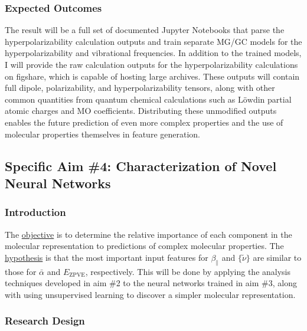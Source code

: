 \documentclass[12pt]{article}
\begin{document}
\subsubsection{Expected Outcomes}
\label{sec:orgab762db}

The result will be a full set of documented Jupyter Notebooks that parse the hyperpolarizability calculation outputs and train separate MG/GC models for the hyperpolarizability and vibrational frequencies. In addition to the trained models, I will provide the raw calculation outputs for the hyperpolarizability calculations on figshare\cite{figshare}, which is capable of hosting large archives. These outputs will contain full dipole, polarizability, and hyperpolarizability tensors, along with other common quantities from quantum chemical calculations such as \(\text{L\"owdin}\) partial atomic charges and MO coefficients. Distributing these unmodified outputs enables the future prediction of even more complex properties and the use of molecular properties themselves in feature generation.

\subsection{Specific Aim \#4: Characterization of Novel Neural Networks}
\label{sec:org1af2083}

\subsubsection{Introduction}
\label{sec:orgde7dc9f}

The \uline{objective} is to determine the relative importance of each component in the molecular representation to predictions of complex molecular properties. The \uline{hypothesis} is that the most important input features for \(\beta_{\parallel}\) and \(\{\tilde{\nu}\}\) are similar to those for \(\bar{\alpha}\) and \(E_{\text{ZPVE}}\), respectively. This will be done by applying the analysis techniques developed in aim \#2 to the neural networks trained in aim \#3, along with using unsupervised learning to discover a simpler molecular representation.

\subsubsection{Research Design}
\label{sec:org6ef7216}
\end{document}
